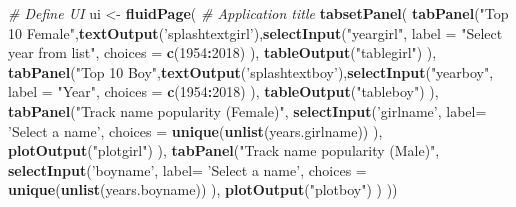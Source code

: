 \documentclass[]{article}
\newenvironment{Shaded}{\begin{snugshade}}{\end{snugshade}}
\newcommand{\CommentTok}[1]{\textcolor[rgb]{0.56,0.35,0.01}{\textit{#1}}}
\newcommand{\DataTypeTok}[1]{\textcolor[rgb]{0.13,0.29,0.53}{#1}}
\newcommand{\DecValTok}[1]{\textcolor[rgb]{0.00,0.00,0.81}{#1}}
\newcommand{\KeywordTok}[1]{\textcolor[rgb]{0.13,0.29,0.53}{\textbf{#1}}}
\newcommand{\NormalTok}[1]{#1}
\newcommand{\OperatorTok}[1]{\textcolor[rgb]{0.81,0.36,0.00}{\textbf{#1}}}
\newcommand{\StringTok}[1]{\textcolor[rgb]{0.31,0.60,0.02}{#1}}
\begin{document}
\begin{Shaded}
\begin{Highlighting}[]
{{\CommentTok{# Define UI }
\NormalTok{ui <-}\StringTok{ }\KeywordTok{fluidPage}\NormalTok{(}
    \CommentTok{# Application title}
    \KeywordTok{tabsetPanel}\NormalTok{(}
        \KeywordTok{tabPanel}\NormalTok{(}\StringTok{"Top 10 Female"}\NormalTok{,}\KeywordTok{textOutput}\NormalTok{(}\StringTok{'splashtextgirl'}\NormalTok{),}\KeywordTok{selectInput}\NormalTok{(}\StringTok{"yeargirl"}\NormalTok{, }\DataTypeTok{label =} \StringTok{"Select year from list"}\NormalTok{,}
                             \DataTypeTok{choices =} \KeywordTok{c}\NormalTok{(}\DecValTok{1954}\OperatorTok{:}\DecValTok{2018}\NormalTok{)}
\NormalTok{        ),}
        \KeywordTok{tableOutput}\NormalTok{(}\StringTok{"tablegirl"}\NormalTok{)}
\NormalTok{        ),}
        \KeywordTok{tabPanel}\NormalTok{(}\StringTok{"Top 10 Boy"}\NormalTok{,}\KeywordTok{textOutput}\NormalTok{(}\StringTok{'splashtextboy'}\NormalTok{),}\KeywordTok{selectInput}\NormalTok{(}\StringTok{"yearboy"}\NormalTok{, }\DataTypeTok{label =} \StringTok{"Year"}\NormalTok{,}
                                             \DataTypeTok{choices =} \KeywordTok{c}\NormalTok{(}\DecValTok{1954}\OperatorTok{:}\DecValTok{2018}\NormalTok{)}
\NormalTok{        ),}
        \KeywordTok{tableOutput}\NormalTok{(}\StringTok{"tableboy"}\NormalTok{)}
\NormalTok{        ),}
        \KeywordTok{tabPanel}\NormalTok{(}\StringTok{"Track name popularity (Female)"}\NormalTok{, }\KeywordTok{selectInput}\NormalTok{(}\StringTok{'girlname'}\NormalTok{, }\DataTypeTok{label=} \StringTok{'Select a name'}\NormalTok{, }\DataTypeTok{choices =} \KeywordTok{unique}\NormalTok{(}\KeywordTok{unlist}\NormalTok{(years.girlname))}
\NormalTok{        ),}
        \KeywordTok{plotOutput}\NormalTok{(}\StringTok{"plotgirl"}\NormalTok{)}
\NormalTok{    ),}
    \KeywordTok{tabPanel}\NormalTok{(}\StringTok{"Track name popularity (Male)"}\NormalTok{, }\KeywordTok{selectInput}\NormalTok{(}\StringTok{'boyname'}\NormalTok{, }\DataTypeTok{label=} \StringTok{'Select a name'}\NormalTok{, }\DataTypeTok{choices =} \KeywordTok{unique}\NormalTok{(}\KeywordTok{unlist}\NormalTok{(years.boyname))}
\NormalTok{    ),}
    \KeywordTok{plotOutput}\NormalTok{(}\StringTok{"plotboy"}\NormalTok{)    }
\NormalTok{    )}
\NormalTok{    ))}


}}
\end{Highlighting}
\end{Shaded}
\end{document}
